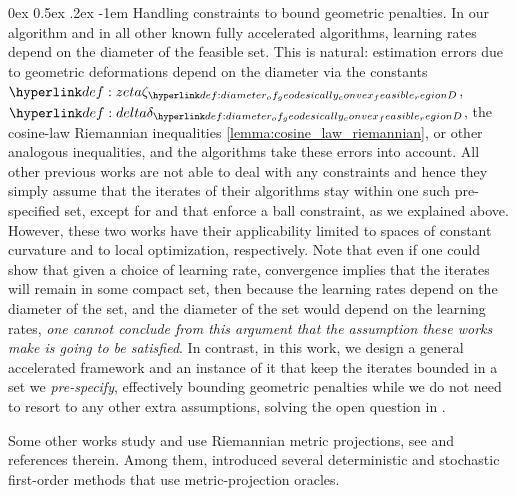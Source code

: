 \documentclass[12pt]{alt2021}
\makeatletter
\renewcommand\paragraph{\@startsection{paragraph}{4}{\z@}%
                                    {0ex \@plus0.5ex \@minus.2ex}%
                                    {-1em}%
                                    {\normalfont\normalsize\bfseries}}
\makeatother
\begin{document}
\paragraph{Handling constraints to bound geometric penalties.}\hypertarget{sec:handling_constraints_to_bound_geometric_penalties}{} In our algorithm and in all other known fully accelerated algorithms, learning rates depend on the diameter of the feasible set. This is natural: estimation errors due to geometric deformations depend on the diameter via the constants $\zeta{\D}$, $\delta{\D}$, the cosine-law Riemannian inequalities \cref{lemma:cosine_law_riemannian}, or other analogous inequalities, and the algorithms take these errors into account. All other previous works are not able to deal with any constraints and hence they simply assume that the iterates of their algorithms stay within one such pre-specified set, except for \citep{martinez2020global} and \citep{criscitiello2022negative} that enforce a ball constraint, as we explained above. However, these two works have their applicability limited to spaces of constant curvature and to local optimization, respectively. Note that even if one could show that given a choice of learning rate, convergence implies that the iterates will remain in some compact set, then because the learning rates depend on the diameter of the set, and the diameter of the set would depend on the learning rates, \emph{one cannot conclude from this argument that the assumption these works make is going to be satisfied}. In contrast, in this work, we design a general accelerated framework and an instance of it that keep the iterates bounded in a set we \emph{pre-specify}, effectively bounding geometric penalties while we do not need to resort to any other extra assumptions, solving the open question in \citep{kim2022accelerated}.


Some other works study and use Riemannian metric projections, see \citep{walter1974metric, hosseini2013metric, barani2013metric, bacak2014convex, zhang2016first} and references therein. Among them, \citep{zhang2016first} introduced several deterministic and stochastic first-order methods that use metric-projection oracles.
\end{document}
